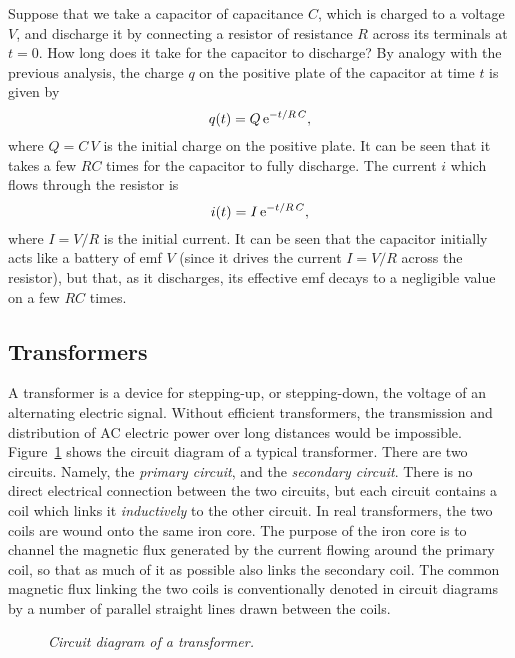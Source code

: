 Suppose that we take a capacitor of capacitance $C$, which is charged to a voltage
$V$, and discharge it by connecting a resistor of resistance $R$ across
its terminals at $t=0$. How long does it take for the capacitor to
discharge? By analogy with the previous analysis, the charge $q$ on the
positive plate of the capacitor at time $t$ is given by
\begin{equation}
q(t) = Q\,{\rm e}^{-t/R\,C},
\end{equation}
where $Q=C\,V$ is the initial charge on the positive plate. It can be seen that
it takes a few $RC$ times for the capacitor to fully discharge. 
The current $i$ which flows through the resistor is
\begin{equation}
i(t) = I\,{\rm e}^{-t/R\,C},
\end{equation}
where $I = V/R$ is the initial current. It can be seen that the capacitor
initially acts like a battery of emf $V$ (since it drives the current
$I=V/R$ across the resistor), but that, as it discharges, its effective 
emf decays to a negligible value on a few $RC$ times. 

\subsection{Transformers}
A transformer is a device for stepping-up, or stepping-down, the voltage  of
an alternating electric 
signal. Without efficient transformers, the  transmission and
distribution of AC
electric power over long distances would be impossible. Figure~\ref{f10.8}
shows the circuit diagram of a typical transformer.
There are two  circuits. Namely, the {\em primary circuit}, and the {\em secondary circuit}.
There is no direct electrical connection between the two circuits, but 
each circuit contains a coil which links it {\em inductively}\/ to the other circuit.
In real transformers, the two coils are wound onto the same iron core.
The purpose of the iron core is to channel the magnetic flux generated by
the current flowing around the primary coil, so that 
as much of it as possible also links the
secondary coil. The common  magnetic flux linking the two coils is conventionally
denoted in circuit diagrams by a number of parallel straight lines drawn between the coils.

\begin{figure}[h]
\epsfysize=2.5in
\centerline{}
\caption{\em Circuit diagram of a transformer.}\label{f10.8}
\end{figure}

